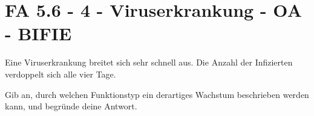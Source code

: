 \section{FA 5.6 - 4 - Viruserkrankung - OA - BIFIE}

\begin{beispiel}[FA 5.6]{1} %
Eine Viruserkrankung breitet sich sehr schnell aus. Die Anzahl der Infizierten verdoppelt sich alle vier Tage. 

Gib an, durch welchen Funktionstyp ein derartiges Wachstum beschrieben werden kann, und begründe deine Antwort.

\end{beispiel}
